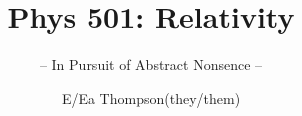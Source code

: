 \documentclass[graybox,envcountchap,sectrefs]{style/svmono}
\begin{document}
\author{E/Ea Thompson(they/them)}
\title{Phys 501: Relativity}
\subtitle{-- In Pursuit of Abstract Nonsence --}
\maketitle

\frontmatter%

% 
% 

% 

\tableofcontents




\mainmatter%
%








\backmatter%
% 
% 
% 
\printindex

\end{document}
